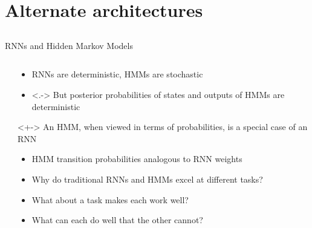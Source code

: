 \section{Alternate architectures}
\subsection{}

\begin{frame}{RNNs and Hidden Markov Models}
    \begin{columns}
        \begin{column}{0.46\textwidth}
            
        \end{column}
        \begin{column}{0.54\textwidth}
            \begin{itemize}
                \item<+-> RNNs are deterministic, HMMs are stochastic
                \item<.-> But posterior probabilities of states and outputs of HMMs are deterministic
            \end{itemize}
            \begin{block}{}<+->
                An HMM, when viewed in terms of probabilities, is a special case of an RNN
            \end{block}
            \begin{itemize}[<.->]
                \item HMM transition probabilities analogous to RNN weights
                \item<+-> Why do traditional RNNs and HMMs excel at different tasks?
                \item What about a task makes each work well?
                \item What can each do well that the other cannot?
            \end{itemize}
        \end{column}
    \end{columns}
\end{frame}

